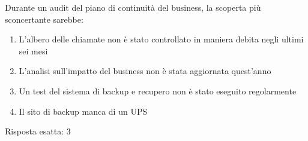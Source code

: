 \begin{Exercise} [
  title={Domanda su BCP},
  label={bcdr5}
 ]
 
 \Question Durante un audit del piano di continuità del business, la scoperta 
 più sconcertante sarebbe:
 \begin{enumerate}
   \item L'albero delle chiamate non è stato controllato in maniera debita 
   negli ultimi sei mesi
   \item L'analisi sull'impatto del business non è stata aggiornata quest'anno
   \item Un test del sistema di backup e recupero non è stato eseguito 
   regolarmente
   \item Il sito di backup manca di un UPS
 \end{enumerate}
  
\end{Exercise}

\begin{Answer} [
  ref={bcdr5},
  number={5}
 ]
 
 \Question Risposta esatta: 3
 
\end{Answer}
